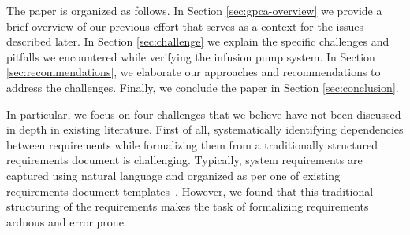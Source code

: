 The paper is organized as follows. In Section \ref{sec:gpca-overview} we provide a brief overview of our previous effort that serves as a context for the issues described later. In Section \ref{sec:challenge} we explain the specific challenges and pitfalls we encountered while verifying the infusion pump system. In Section \ref{sec:recommendations}, we elaborate our approaches and recommendations to address the challenges. Finally, we conclude the paper in Section \ref{sec:conclusion}.
\iffalse

%
%
%
%


%
In particular, we focus on four challenges that we believe have not been discussed in depth in existing literature. First of all, systematically identifying dependencies between requirements while formalizing them from a traditionally structured requirements document is challenging. Typically, system requirements are captured using natural language and organized as per one of existing requirements document templates~\cite{IEEE formats}. However, we found that this traditional structuring of the requirements makes the task of formalizing requirements arduous and error prone. 



